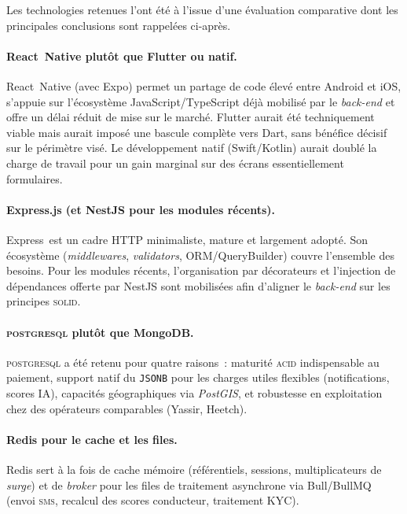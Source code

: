 \documentclass[12pt, a4paper, oneside]{report}
\begin{document}
Les technologies retenues l'ont été à l'issue d'une évaluation comparative dont les principales conclusions sont rappelées ci-après.

\paragraph{React~Native plutôt que Flutter ou natif.} React~Native (avec Expo) permet un partage de code élevé entre Android et iOS, s'appuie sur l'écosystème JavaScript/TypeScript déjà mobilisé par le \textit{back-end} et offre un délai réduit de mise sur le marché. Flutter aurait été techniquement viable mais aurait imposé une bascule complète vers Dart, sans bénéfice décisif sur le périmètre visé. Le développement natif (Swift/Kotlin) aurait doublé la charge de travail pour un gain marginal sur des écrans essentiellement formulaires.

\paragraph{Express.js (et NestJS pour les modules récents).} Express~est un cadre HTTP minimaliste, mature et largement adopté. Son écosystème (\textit{middlewares}, \textit{validators}, ORM/QueryBuilder) couvre l'ensemble des besoins. Pour les modules récents, l'organisation par décorateurs et l'injection de dépendances offerte par NestJS sont mobilisées afin d'aligner le \textit{back-end} sur les principes \textsc{solid}.

\paragraph{\textsc{postgresql} plutôt que MongoDB.} \textsc{postgresql} a été retenu pour quatre raisons~: maturité \textsc{acid} indispensable au paiement, support natif du \texttt{JSONB} pour les charges utiles flexibles (notifications, scores IA), capacités géographiques via \textit{PostGIS}, et robustesse en exploitation chez des opérateurs comparables (Yassir, Heetch).

\paragraph{Redis pour le cache et les files.} Redis sert à la fois de cache mémoire (référentiels, sessions, multiplicateurs de \textit{surge}) et de \textit{broker} pour les files de traitement asynchrone via Bull/BullMQ (envoi \textsc{sms}, recalcul des scores conducteur, traitement KYC).
\end{document}
